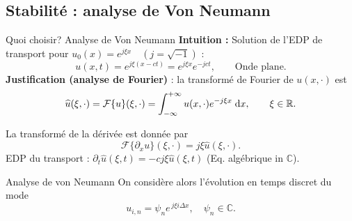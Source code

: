 \documentclass[aspectratio=169, french]{beamer}
\newcommand{\bbR}{\mathbb{R}}
\newcommand{\bbC}{\mathbb{C}}
\begin{document}
\subsection{Stabilité : analyse de Von Neumann}


\begin{frame}{Quoi choisir? Analyse de Von Neumann}
	\textbf{Intuition : } Solution de l'EDP de transport pour $u_0(x) = e^{j \xi x} \quad (j = \sqrt{-1})$ :
	\begin{equation*}
	u(x, t) = e^{j \xi(x-ct)} = e^{j \xi x}e^{-jct}, \qquad \text{Onde plane.}
	\end{equation*}
	\textbf{Justification (analyse de Fourier)} :  la transformé de Fourier de $u(x, \cdot)$ est
	\begin{equation*}
		\widehat{u}(\xi, \cdot) = \mathcal{F}\{u\}(\xi, \cdot) = \int_{-\infty}^{+\infty} u(x, \cdot)e^{- j \xi x}  \d{x}, \qquad \xi \in \bbR.
	\end{equation*}

La transformé de la dérivée est donnée par
\begin{equation*}
\mathcal{F}\{\partial_{x} u\}(\xi, \cdot) = j \xi \widehat{u}(\xi, \cdot).
\end{equation*}
EDP du transport : $\partial_t{\widehat{u}}(\xi, t) = -c  j  \xi \widehat{u}(\xi, t)$ \hspace{.3cm} (Eq. algébrique in $\bbC$).
\begin{block}{Analyse de von Neumann}
		On considère alors l'évolution en temps discret du mode
		\begin{equation*}
			u_{i, n} = \psi_n e^{\, j \xi  i  \Delta x}, \quad \psi_n \in \bbC.
		\end{equation*}
\end{block}
\end{frame}
\end{document}
